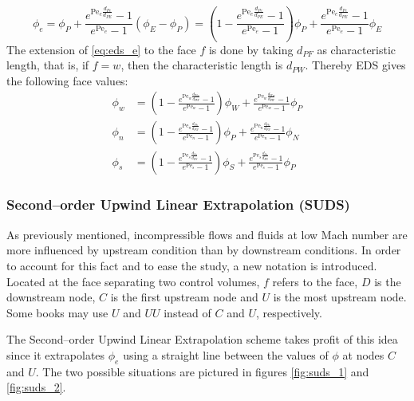 \begin{equation} \label{eq:eds_e}
	\phi_e = 
	\phi_P + \frac{e^{\mathrm{Pe}_e \frac{d_{Pe}}{d_{PE}}} - 1}{e^{\mathrm{Pe}_e} - 1} (\phi_E - \phi_P) = 
	\left( 1 - \frac{e^{\mathrm{Pe}_e \frac{d_{Pe}}{d_{PE}}} - 1}{e^{\mathrm{Pe}_e} - 1} \right) \phi_P + 
	\frac{e^{\mathrm{Pe}_e \frac{d_{Pe}}{d_{PE}}} - 1}{e^{\mathrm{Pe}_e} - 1} \phi_E
\end{equation}
The extension of \eqref{eq:eds_e} to the face $f$ is done by taking $d_{PF}$ as characteristic length, that is, if $f = w$, then the characteristic length is $d_{PW}$. Thereby EDS gives the following face values:
\begin{align}
	\phi_w &= 
	\left( 1 - \frac{e^{\mathrm{Pe}_w \frac{d_{Ww}}{d_{PW}}} - 1}{e^{\mathrm{Pe}_w} - 1} \right)
	 \phi_W + 
	\frac{e^{\mathrm{Pe}_w \frac{d_{Ww}}{d_{PW}}} - 1}{e^{\mathrm{Pe}_w} - 1} \phi_P \\
	\phi_n &= 
	\left( 1 - \frac{e^{\mathrm{Pe}_n \frac{d_{Pn}}{d_{PN}}} - 1}{e^{\mathrm{Pe}_n} - 1} \right)
	 \phi_P + 
	\frac{e^{\mathrm{Pe}_n \frac{d_{Pn}}{d_{PN}}} - 1}{e^{\mathrm{Pe}_n} - 1} \phi_N \\
	\phi_s &= 
	\left( 1 - \frac{e^{\mathrm{Pe}_s \frac{d_{Ss}}{d_{PS}}} - 1}{e^{\mathrm{Pe}_s} - 1} \right)
	\phi_S + 
	\frac{e^{\mathrm{Pe}_s \frac{d_{Ss}}{d_{PS}}} - 1}{e^{\mathrm{Pe}_s} - 1} \phi_P
	\label{eq:eds_s}	
\end{align}

\subsubsection{Second--order Upwind Linear Extrapolation (SUDS)}

As previously mentioned, incompressible flows and fluids at low Mach number are more influenced by upstream condition than by downstream conditions. In order to account for this fact and to ease the study, a new notation is introduced. Located at the face separating two control volumes, $f$ refers to the face, $D$ is the downstream node, $C$ is the first upstream node and $U$ is the most upstream node. Some books may use $U$ and $UU$ instead of $C$ and $U$, respectively.

The Second--order Upwind Linear Extrapolation scheme takes profit of this idea since it extrapolates $\phi_e$ using a straight line between the values of $\phi$ at nodes $C$ and $U$. The two possible situations are pictured in figures \ref{fig:suds_1} and \ref{fig:suds_2}.


